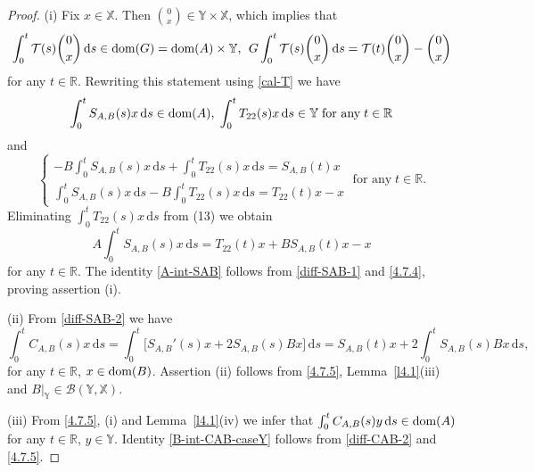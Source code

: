 \documentclass[11pt]{amsart}
\numberwithin{equation}{section}
\newcommand{\SAB}{S_{A,B}}
\newcommand{\CAB}{C_{A,B}}
\newcommand{\rmd}{{\mathrm{d}}}
\theoremstyle{remark}
\theoremstyle{definition}
\newcommand\bX{{\mathbb X}}
\newcommand\bY{{\mathbb Y}}
\newcommand{\dom}{\text{\rm{dom}}}
\begin{document}
\begin{proof}
	(i) Fix $x \in \bX$. Then $\binom{0}{x} \in \bY \times \bX$, which implies that
	\begin{equation}\label{4.7.1}
		\int_0^t \mathcal{T}(s)\binom{0}{x} \, \rmd s \in \dom(G) = \dom(A) \times \bY,\,\;	G\int_0^t \mathcal{T}(s)\binom{0}{x} \, \rmd s = \mathcal{T}(t)\binom{0}{x} - \binom{0}{x}
	\end{equation}\label{4.7.2}
	for any $t \in \mathbb{R}$. Rewriting this statement using \eqref{cal-T} we have
	\begin{equation}
		\int_0^t \SAB(s)x \, \rmd s \in \dom(A),\;\int_0^t T_{22}(s)x \, \rmd s \in \bY\; \text{for any}\; t \in \mathbb{R}
	\end{equation}
	and
	\begin{equation}\label{4.7.3}	
		\begin{cases}
			\displaystyle-B\int_0^t \SAB(s)x \, \rmd s + \int_0^t T_{22}(s)x \, \rmd s = \SAB(t)x \\
			\displaystyle\int_0^t \SAB(s)x \, \rmd s - B\int_0^t T_{22}(s)x \, \rmd s = T_{22}(t)x - x
		\end{cases}\; \text{for any}\; t \in \mathbb{R}.
	\end{equation} 
	Eliminating $\displaystyle\int_0^t T_{22}(s)x \, \rmd s$ from (13) we obtain
	\begin{equation}\label{4.7.4}
		A\int_0^t \SAB(s)x \, \rmd s = T_{22}(t)x + B\SAB(t)x - x
	\end{equation}
	for any $t \in \mathbb{R}$. The identity \eqref{A-int-SAB} follows from  \eqref{diff-SAB-1} and \eqref{4.7.4}, proving assertion (i).
	
	(ii) From \eqref{diff-SAB-2} we have
	\begin{equation}\label{4.7.5}
		\int_0^t \CAB(s)x \, \rmd s
		= \int_0^t \bigl[\SAB'(s)x + 2\SAB(s)Bx\bigr] \, \rmd s
		= \SAB(t)x + 2\int_0^t \SAB(s)Bx \, \rmd s, 
	\end{equation}
	for any $t \in \mathbb{R}$, $x \in \dom(B)$. Assertion (ii) follows from \eqref{4.7.5}, Lemma~\ref{l4.1}(iii) and $B|_\bY \in \mathcal{B}(\bY,\bX)$.
	
	(iii) From \eqref{4.7.5}, (i) and Lemma~\ref{l4.1}(iv) we infer that
	$\int_0^t \CAB(s)y \, \rmd s \in \dom(A)$ for any $t \in \mathbb{R}$, $y \in \bY$. Identity \eqref{B-int-CAB-caseY} follows from \eqref{diff-CAB-2} and  \eqref{4.7.5}.
	

\end{proof}
\end{document}
